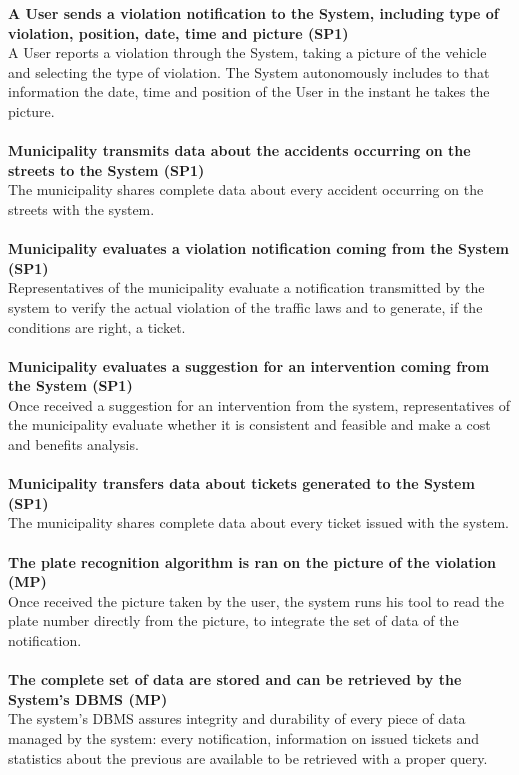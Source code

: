 \documentclass {article}
\begin{document}
	{\bf A User sends a violation notification to the System, including type of violation, position, date, time and picture (SP1)} \\
		A User reports a violation through the System, taking a picture of the vehicle and selecting the type of violation. The System autonomously includes to that information the date, time and position of the User in the instant he takes the picture. \\ \\
	{\bf Municipality transmits data about the accidents occurring on the streets to the System (SP1)}\\
		The municipality shares complete data about every accident occurring on the streets with the system.\\ \\
	{\bf Municipality evaluates a violation notification coming from the System (SP1)}\\ 
		Representatives of the municipality evaluate a notification transmitted by the system to verify the actual violation of the traffic laws and to generate, if the conditions are right, a ticket. \\ \\
	{\bf Municipality evaluates a suggestion for an intervention coming from the System (SP1)}\\ 
		Once received a suggestion for an intervention from the system, representatives of the municipality evaluate whether it is consistent and feasible and make a cost and benefits analysis.\\ \\
	{\bf Municipality transfers data about tickets generated to the System (SP1)}\\
		The municipality shares complete data about every ticket issued with the system.\\ \\
	{\bf The plate recognition algorithm is ran on the picture of the violation (MP)}\\
		Once received the picture taken by the user, the system runs his tool to read the plate number directly from the picture, to integrate the set of data of the notification.\\ \\
	{\bf The complete set of data are stored and can be retrieved by the System's DBMS (MP)}\\
		The system’s DBMS assures integrity and durability of every piece of data managed by the system: every notification, information on issued tickets and statistics about the previous are available to be retrieved with a proper query.\\
		
\end{document}
